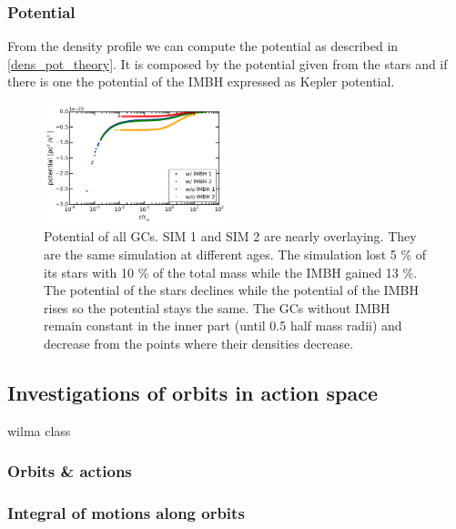 \subsubsection{Potential}
From the density profile we can compute the potential as described in \ref{dens_pot_theory}. It is composed by the potential given from the stars and if there is one the potential of the \ac{IMBH} expressed as Kepler potential.
\begin{figure}[htbp]
	\centering
	\includegraphics[width=0.475\textwidth]{Plots/potential.png}
	\caption{Potential of all \acp{GC}. SIM 1 and SIM 2 are nearly overlaying. They are the same simulation at different ages. The simulation lost 5 \% of its stars with 10 \% of the total mass while the \ac{IMBH} gained 13 \%. The potential of the stars declines while the potential of the \ac{IMBH} rises so the potential stays the same. The \acp{GC} without \ac{IMBH} remain constant in the inner part (until 0.5 half mass radii) and decrease from the points where their densities decrease.}
\end{figure}


\subsection{Investigations of orbits in action space}
wilma class 
\subsubsection{Orbits \& actions}


\subsubsection{Integral of motions along orbits}
